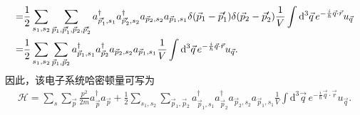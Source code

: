 \documentclass{assignment}
\begin{document}
\begin{pf}
\begin{align}
        \notag=&\frac{1}{2}\sum_{s_1,s_2}\sum_{\vec{p}_1,\vec{p}_1',\vec{p}_2,\vec{p}_2'}a_{\vec{p}_1',s_1}^{\dagger}a_{\vec{p}_2',s_2}^{\dagger}a_{\vec{p}_2,s_2}a_{\vec{p}_1,s_1}\delta(\vec{p}_1-\vec{p}_1')\delta(\vec{p}_2-\vec{p}_2')\frac{1}{V}\int\mathrm{d}^3\vec{q}\,e^{-\frac{i}{\hbar}\vec{q}\cdot\vec{r}}u_{\vec{q}}\\
        =&\frac{1}{2}\sum_{s_1,s_2}\sum_{\vec{p}_1,\vec{p}_2}a_{\vec{p}_1,s_1}^{\dagger}a_{\vec{p}_2}^{\dagger}a_{\vec{p}_2,s_2}a_{\vec{p}_1,s_1}\frac{1}{V}\int\mathrm{d}^3\vec{q}\,e^{-\frac{i}{\hbar}\vec{q}\cdot\vec{r}}u_{\vec{q}}.
    \end{align}
    因此，该电子系统哈密顿量可写为
    \begin{align}
        \mathcal{H}=\sum_s\sum_{\vec{p}}\frac{p^2}{2m}a_{\vec{p}}^{\dagger}a_{\vec{p}}+\frac{1}{2}\sum_{s_1,s_2}\sum_{\vec{p}_1,\vec{p}_2}a_{\vec{p}_1,s_1}^{\dagger}a_{\vec{p}_2}^{\dagger}a_{\vec{p}_2,s_2}a_{\vec{p}_1,s_1}\frac{1}{V}\int\mathrm{d}^3\vec{q}\,e^{-\frac{i}{\hbar}\vec{q}\cdot\vec{r}}u_{\vec{q}}.
    \end{align}
\end{pf}
\end{document}
